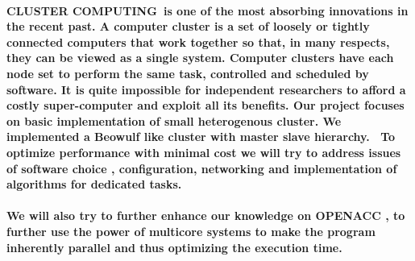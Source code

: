 \documentclass[a4paper]{article}
\newcommand\textstyleStrong[1]{\textmd{\MakeUppercase{#1}}}
\begin{document}
\paragraph[Cluster Computing~is one of the most absorbing innovations in the recent past. A computer cluster is a set of
loosely or tightly connected computers that work together so that, in many respects, they can be viewed as a single
system. Computer clusters have each node set to perform the same task, controlled and scheduled by software. It is
quite impossible for independent researchers to afford a costly super{}-computer and exploit all its benefits. Our
project focuses on basic implementation of small heterogenous cluster. We implemented a Beowulf like cluster with
master slave hierarchy. \ To optimize performance with minimal cost we will try to address issues of software choice ,
configuration, networking and implementation of algorithms for dedicated
tasks.]{\textstyleStrong{\textup{\textcolor[rgb]{0.14117648,0.16078432,0.18039216}{Cluster
Computing}}}\textup{\textcolor[rgb]{0.14117648,0.16078432,0.18039216}{~}}\textmd{\textup{\textcolor[rgb]{0.14117648,0.16078432,0.18039216}{is
one of the most absorbing innovations in the recent past.}}}\textup{\textcolor[rgb]{0.14117648,0.16078432,0.18039216}{
}}\textmd{\textup{\textcolor[rgb]{0.14117648,0.16078432,0.18039216}{A computer cluster is a set of loosely or tightly
connected computers that work together so that, in many respects, they can be viewed as a single system. Computer
clusters have each node set to perform the same task, controlled and scheduled by software. It is quite impossible for
independent researchers to afford a costly super-computer and exploit all its benefits. Our project focuses on basic
implementation of small heterogenous cluster. We implemented a Beowulf like cluster with master slave hierarchy. \ To
optimize performance with minimal cost we will try to address issues of software choice , configuration, networking and
implementation of algorithms for dedicated tasks.}}}}
\paragraph[We will also try to further enhance our knowledge on OPENACC , to further use the power of multicore systems
to make the program inherently parallel and thus optimizing the execution
time.]{\textmd{\textup{\textcolor[rgb]{0.14117648,0.16078432,0.18039216}{We will also try to further enhance our
knowledge on OPENACC , to further use the power of multicore systems to make the program inherently parallel and thus
optimizing the execution time.}}}}
\end{document}
